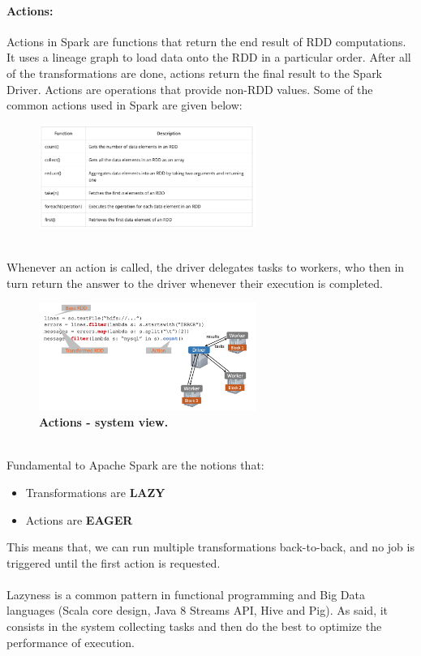 \documentclass[10pt,a4paper]{article}
\newcommand{\nline}{\\~\\}
\begin{document}
 \paragraph{Actions:}
 Actions in Spark are functions that return the end result of RDD computations. It uses a lineage graph to load data onto the RDD in a particular order. After all of the transformations are done, actions return the final result to the Spark Driver. Actions are operations that provide non-RDD values. Some of the common actions used in Spark are given below:
    \begin{figure}[ht!]
 \hfill \includegraphics[width=200pt]{images/spark-rdd-actions}
 \hspace*{\fill}
 \end{figure}  \\
 Whenever an action is called, the driver delegates tasks to workers, who then in turn return the answer to the driver whenever their execution is completed.
       \begin{figure}[ht!]
 \hfill \includegraphics[width=200pt]{images/spark-rdd-actions-system}
 \hspace*{\fill}
 \caption{\textbf{Actions - system view.}}
 \end{figure}  \\
 Fundamental to Apache Spark are the notions that:
 \begin{itemize}
 	\item Transformations are \textbf{LAZY}
 	\item Actions are \textbf{EAGER}
 \end{itemize}
 This means that, we can run multiple transformations back-to-back, and no job is triggered until the first action is requested. \nline
 Lazyness is a common pattern in functional programming and Big Data languages (Scala core design, Java 8 Streams API, Hive and Pig). As said, it consists in the system collecting tasks and then do the best to optimize the performance of execution. \\
\end{document}
